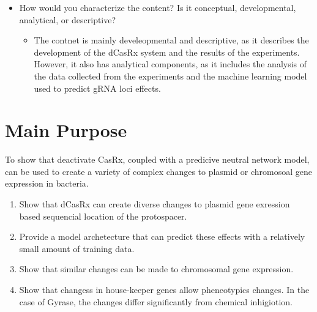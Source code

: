 \documentclass[12pt]{article}
\begin{document}
\begin{itemize}
    \item How would you characterize the content? Is it conceptual, developmental, analytical, or descriptive?
    \begin{itemize}
        \item The contnet is mainly develeopmental and descriptive, as it describes the development of the dCasRx system and the results of the experiments. However, it also has analytical components, as it includes the analysis of the data collected from the experiments and the machine learning model used to predict gRNA loci effects.
    \end{itemize}
\end{itemize}

\section*{Main Purpose}
To show that deactivate CasRx, coupled with a predicive neutral network model, can be used to create a variety of complex changes to plasmid or chromosoal gene expression in bacteria.
\begin{enumerate}
    \item Show that dCasRx can create diverse changes to plasmid gene exression based sequencial location of the protospacer.
    \item Provide a model archetecture that can predict these effects with a relatively small amount of training data.
    \item Show that similar changes can be made to chromosomal gene expression.
    \item Show that changess in house-keeper genes allow pheneotypics changes. In the case of Gyrase, the changes differ significantly from chemical inhigiotion.
\end{enumerate}
\end{document}

